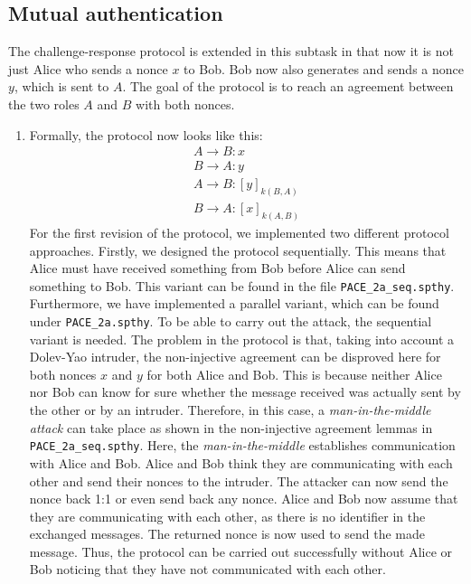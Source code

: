 \documentclass[a4paper,11pt]{scrartcl}
\begin{document}
\subsection{Mutual authentication}
The challenge-response protocol is extended in this subtask in that now it is not just Alice who sends a nonce $x$ to Bob.  Bob now also generates and sends a nonce $y$,  which is sent to $A$. The goal of the protocol is to reach an agreement between the two roles $A$ and $B$ with both nonces. 
\begin{enumerate}[label=\alph*)]
	\item Formally, the protocol now looks like this:
\begin{align*}
A \rightarrow B: x\\
B \rightarrow A: y\\
A \rightarrow B: [y]_{k(B,A)}\\
B \rightarrow A: [x]_{k(A,B)}
\end{align*}
For the first revision of the protocol, we implemented two different protocol approaches.  Firstly,  we designed the protocol sequentially.  This means that Alice must have received something from Bob before Alice can send something to Bob.  This variant can be found in the file \texttt{PACE_2a_seq.spthy}. Furthermore,  we have implemented a parallel variant,  which can be found under \texttt{PACE_2a.spthy}. To be able to carry out the attack, the sequential variant is needed.  \newline
The problem in the protocol is that,  taking into account a Dolev-Yao intruder,  the non-injective agreement can be disproved here for both nonces $x$ and $y$ for both 		Alice and Bob. This is because neither Alice nor Bob can know for sure whether the message received was actually sent by the other or by an intruder.  Therefore, in this case,  a \textit{man-in-the-middle attack} can take place as shown in the non-injective agreement lemmas in \texttt{PACE_2a_seq.spthy}.  \newline
Here, the \textit{man-in-the-middle} establishes communication with Alice and Bob.  Alice and Bob think they are communicating with each other and send their nonces to the intruder. The attacker can now send the nonce back 1:1 or even send back any nonce.  Alice and Bob now assume that they are communicating with each other,  as there is no identifier in the exchanged messages.  The returned nonce is now used to send the made message.  Thus,  the protocol can be carried out successfully without Alice or Bob noticing that they have not communicated with each other.

\end{enumerate}
\end{document}
